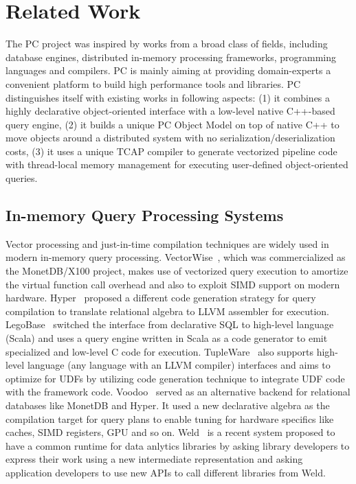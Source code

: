 
\section{Related Work}

The PC project was inspired by works from a broad class of
fields, including database engines, distributed in-memory processing
frameworks,  programming languages and compilers. PC is
mainly aiming at providing domain-experts a convenient platform to build high
performance tools and libraries. PC distinguishes itself with existing
works in following aspects:
(1) it combines a highly declarative object-oriented interface with a
low-level native
C++-based query engine, (2) it builds a unique PC Object Model on top of
native C++ to move objects around a distributed system with no
serialization/deserialization costs, (3) it uses a unique TCAP compiler to generate vectorized
pipeline code with thread-local memory management for executing
user-defined object-oriented queries.

\subsection {In-memory Query Processing Systems}
Vector processing and just-in-time compilation techniques are widely
used in modern in-memory query
processing. VectorWise~\cite{zukowski2012vectorwise}, which was
commercialized as the MonetDB/X100 project, makes use of vectorized
query execution to amortize the virtual function call overhead and
also to exploit SIMD support on modern hardware.
Hyper~\cite{neumann2011efficiently} proposed a different code
generation strategy for query compilation to translate relational
algebra to LLVM assembler for execution.
 LegoBase~\cite{klonatos2014building} switched the interface
from declarative SQL to high-level language (Scala) and uses a query engine
written in Scala as a code generator to emit specialized and low-level
C code for execution. TupleWare~\cite{crotty2015tupleware} also supports
high-level language (any language with an LLVM compiler) interfaces
and aims to
optimize for UDFs by utilizing code
generation technique to integrate UDF code with the framework
code. Voodoo~\cite{pirk2016voodoo} served as an alternative backend for
relational databases like MonetDB and Hyper. It used a new
declarative algebra as the compilation target for query plans to
enable tuning for hardware specifics like caches, SIMD registers,
GPU and so on. Weld~\cite{palkar2017weld} is a recent system proposed
to have a common runtime for data anlytics libraries by asking library
developers to express their work using a new intermediate
representation and asking application developers to use new APIs to
call different libraries from Weld.  

